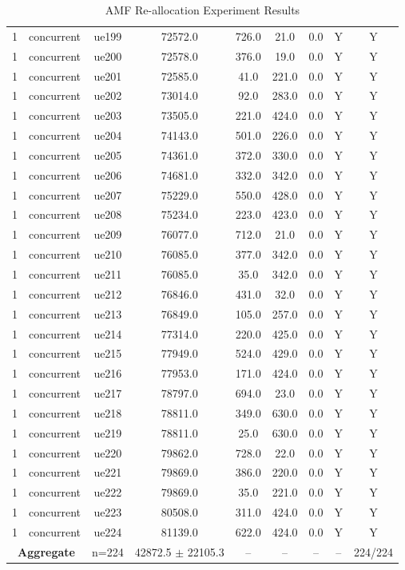 \begin{table}[ht]
\begin{tabular}{|c|c|c|c|c|c|c|c|c|}
1 & concurrent & ue199 & 72572.0 & 726.0 & 21.0 & 0.0 & Y & Y \\
1 & concurrent & ue200 & 72578.0 & 376.0 & 19.0 & 0.0 & Y & Y \\
1 & concurrent & ue201 & 72585.0 & 41.0 & 221.0 & 0.0 & Y & Y \\
1 & concurrent & ue202 & 73014.0 & 92.0 & 283.0 & 0.0 & Y & Y \\
1 & concurrent & ue203 & 73505.0 & 221.0 & 424.0 & 0.0 & Y & Y \\
1 & concurrent & ue204 & 74143.0 & 501.0 & 226.0 & 0.0 & Y & Y \\
1 & concurrent & ue205 & 74361.0 & 372.0 & 330.0 & 0.0 & Y & Y \\
1 & concurrent & ue206 & 74681.0 & 332.0 & 342.0 & 0.0 & Y & Y \\
1 & concurrent & ue207 & 75229.0 & 550.0 & 428.0 & 0.0 & Y & Y \\
1 & concurrent & ue208 & 75234.0 & 223.0 & 423.0 & 0.0 & Y & Y \\
1 & concurrent & ue209 & 76077.0 & 712.0 & 21.0 & 0.0 & Y & Y \\
1 & concurrent & ue210 & 76085.0 & 377.0 & 342.0 & 0.0 & Y & Y \\
1 & concurrent & ue211 & 76085.0 & 35.0 & 342.0 & 0.0 & Y & Y \\
1 & concurrent & ue212 & 76846.0 & 431.0 & 32.0 & 0.0 & Y & Y \\
1 & concurrent & ue213 & 76849.0 & 105.0 & 257.0 & 0.0 & Y & Y \\
1 & concurrent & ue214 & 77314.0 & 220.0 & 425.0 & 0.0 & Y & Y \\
1 & concurrent & ue215 & 77949.0 & 524.0 & 429.0 & 0.0 & Y & Y \\
1 & concurrent & ue216 & 77953.0 & 171.0 & 424.0 & 0.0 & Y & Y \\
1 & concurrent & ue217 & 78797.0 & 694.0 & 23.0 & 0.0 & Y & Y \\
1 & concurrent & ue218 & 78811.0 & 349.0 & 630.0 & 0.0 & Y & Y \\
1 & concurrent & ue219 & 78811.0 & 25.0 & 630.0 & 0.0 & Y & Y \\
1 & concurrent & ue220 & 79862.0 & 728.0 & 22.0 & 0.0 & Y & Y \\
1 & concurrent & ue221 & 79869.0 & 386.0 & 220.0 & 0.0 & Y & Y \\
1 & concurrent & ue222 & 79869.0 & 35.0 & 221.0 & 0.0 & Y & Y \\
1 & concurrent & ue223 & 80508.0 & 311.0 & 424.0 & 0.0 & Y & Y \\
1 & concurrent & ue224 & 81139.0 & 622.0 & 424.0 & 0.0 & Y & Y \\
\multicolumn{2}{|c|}{\textbf{Aggregate}} & n=224 & 42872.5 $\pm$ 22105.3 & -- & -- & -- & -- & 224/224 \\
\hline
\end{tabular}
\caption{AMF Re-allocation Experiment Results}
\label{tab:amf_realloc}
\end{table}
